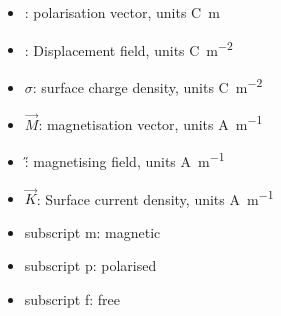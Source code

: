 \begin{itemize}
        \item \p: polarisation vector, units \si{\coulomb\metre}
        \item \D: Displacement field, units \si{\coulomb\per\metre\squared}
        \item $\sigma$: surface charge density, units \si{\coulomb\per\metre\squared}
        \item $\vec{M}$: magnetisation vector, units \si{\ampere\per\metre}
        \item \H: magnetising field, units \si{\ampere\per\metre}
        \item $\vec{K}$: Surface current density, units \si{\ampere\per\metre}
        \item subscript m: magnetic
        \item subscript p: polarised
        \item subscript f: free 
        
    \end{itemize}
